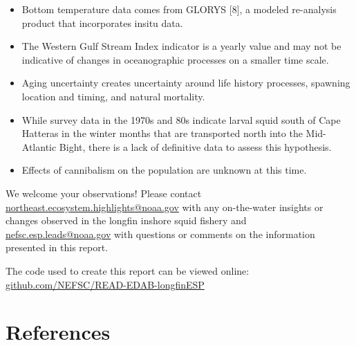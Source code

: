 \documentclass[
  9pt,
  letterpaper,
  DIV=11,
  numbers=noendperiod]{scrartcl}
\begin{document}
\raggedright

\begin{itemize}
\item
  Bottom temperature data comes from GLORYS {[}8{]}, a modeled
  re-analysis product that incorporates insitu data.
\item
  The Western Gulf Stream Index indicator is a yearly value and may not
  be indicative of changes in oceanographic processes on a smaller time
  scale.
\item
  Aging uncertainty creates uncertainty around life history processes,
  spawning location and timing, and natural mortality.
\item
  While survey data in the 1970s and 80s indicate larval squid south of
  Cape Hatteras in the winter months that are transported north into the
  Mid-Atlantic Bight, there is a lack of definitive data to assess this
  hypothesis.
\item
  Effects of cannibalism on the population are unknown at this time.
  \vspace{0.5cm}
\end{itemize}

\centering\normalsize

We welcome your observations! Please contact
\url{northeast.ecosystem.highlights@noaa.gov} with any on-the-water
insights or changes observed in the longfin inshore squid fishery and
\url{nefsc.esp.leads@noaa.gov} with questions or comments on the
information presented in this report.\newline

The code used to create this report can be viewed online:
\href{github.com/NEFSC/READ-EDAB/longfinESP}{github.com/NEFSC/READ-EDAB-longfinESP}

\newpage
{}

\section{References}\label{references}
\end{document}
